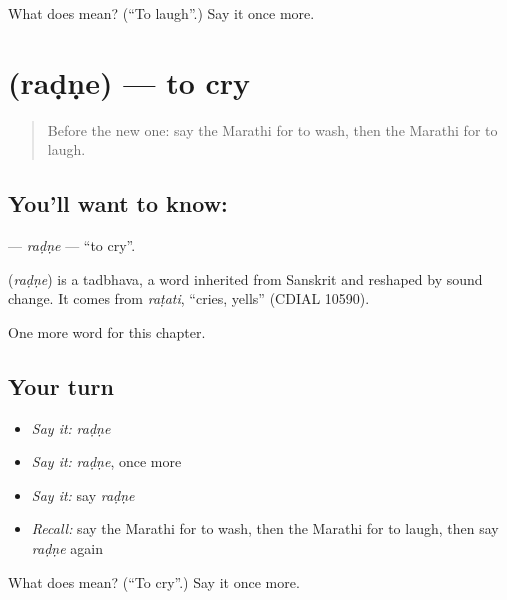 \begin{tcolorbox}[breakable,colback=teal!4,colframe=teal!35!black,title={Before you move on}]
What does  mean? (\textquotedblleft{}To laugh\textquotedblright{}.) Say it once more.
\end{tcolorbox}
\section[\texorpdfstring{\mr{रडणे} (raḍṇe)}{रडणे (raḍṇe)}]{ (raḍṇe) — to cry}

\label{lesson:MR-C79-radne}



\begin{quote}
Before the new one: say the Marathi for to wash, then the Marathi for to laugh.
\end{quote}

\subsection*{You'll want to know: }
\textbf{} — \emph{raḍṇe} — \textquotedblleft{}to cry\textquotedblright{}.

\begin{cousinweb}
\textbf{} (\emph{raḍṇe}) is a tadbhava, a word inherited from Sanskrit and reshaped by sound change. It comes from \emph{raṭati}, \textquotedblleft{}cries, yells\textquotedblright{} (CDIAL 10590).
\end{cousinweb}

\begin{grammarlens}[title={What you've built}]
One more word for this chapter.
\end{grammarlens}

\subsection*{Your turn}
\begin{itemize}
\raggedright
  \item \emph{Say it:} \emph{raḍṇe}
  \item \emph{Say it:} \emph{raḍṇe}, once more
  \item \emph{Say it:} say \emph{raḍṇe}
  \item \emph{Recall:} say the Marathi for to wash, then the Marathi for to laugh, then say \emph{raḍṇe} again
\end{itemize}

\begin{tcolorbox}[breakable,colback=teal!4,colframe=teal!35!black,title={Before you move on}]
What does  mean? (\textquotedblleft{}To cry\textquotedblright{}.) Say it once more.
\end{tcolorbox}
